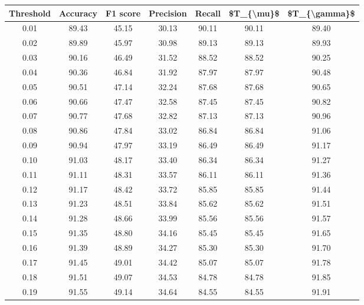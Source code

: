 \begin{tabular}{|c|c|c|c|c|c|c|}
\hline
 Threshold &  Accuracy &  F1 score &  Precision &  Recall &  \$T\_\{\textbackslash mu\}\$ &  \$T\_\{\textbackslash gamma\}\$ \\
\hline
      0.01 &     89.43 &     45.15 &      30.13 &   90.11 &      90.11 &         89.40 \\
      0.02 &     89.89 &     45.97 &      30.98 &   89.13 &      89.13 &         89.93 \\
      0.03 &     90.16 &     46.49 &      31.52 &   88.52 &      88.52 &         90.25 \\
      0.04 &     90.36 &     46.84 &      31.92 &   87.97 &      87.97 &         90.48 \\
      0.05 &     90.51 &     47.14 &      32.24 &   87.68 &      87.68 &         90.65 \\
      0.06 &     90.66 &     47.47 &      32.58 &   87.45 &      87.45 &         90.82 \\
      0.07 &     90.77 &     47.68 &      32.82 &   87.13 &      87.13 &         90.96 \\
      0.08 &     90.86 &     47.84 &      33.02 &   86.84 &      86.84 &         91.06 \\
      0.09 &     90.94 &     47.97 &      33.19 &   86.49 &      86.49 &         91.17 \\
      0.10 &     91.03 &     48.17 &      33.40 &   86.34 &      86.34 &         91.27 \\
      0.11 &     91.11 &     48.31 &      33.57 &   86.11 &      86.11 &         91.36 \\
      0.12 &     91.17 &     48.42 &      33.72 &   85.85 &      85.85 &         91.44 \\
      0.13 &     91.23 &     48.51 &      33.84 &   85.62 &      85.62 &         91.51 \\
      0.14 &     91.28 &     48.66 &      33.99 &   85.56 &      85.56 &         91.57 \\
      0.15 &     91.35 &     48.80 &      34.16 &   85.45 &      85.45 &         91.65 \\
      0.16 &     91.39 &     48.89 &      34.27 &   85.30 &      85.30 &         91.70 \\
      0.17 &     91.45 &     49.01 &      34.42 &   85.07 &      85.07 &         91.78 \\
      0.18 &     91.51 &     49.07 &      34.53 &   84.78 &      84.78 &         91.85 \\
      0.19 &     91.55 &     49.14 &      34.64 &   84.55 &      84.55 &         91.91 \\

\end{tabular}
